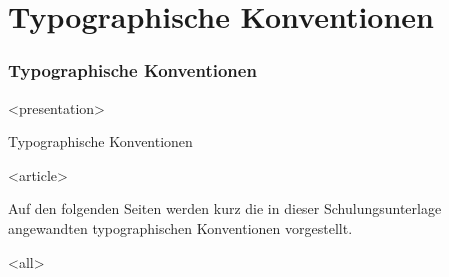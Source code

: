 \section{Typographische Konventionen}

\begin{frame}[fragile]
\frametitle<presentation>{Typographische Konventionen}




\mode
<presentation>

        \begin{center}
        \huge{Typographische Konventionen}
        \end{center}

\mode
<article>

Auf den folgenden Seiten werden kurz die in dieser Schulungsunterlage angewandten typographischen Konventionen vorgestellt.

\mode
<all>

\end{frame}
\newpage

